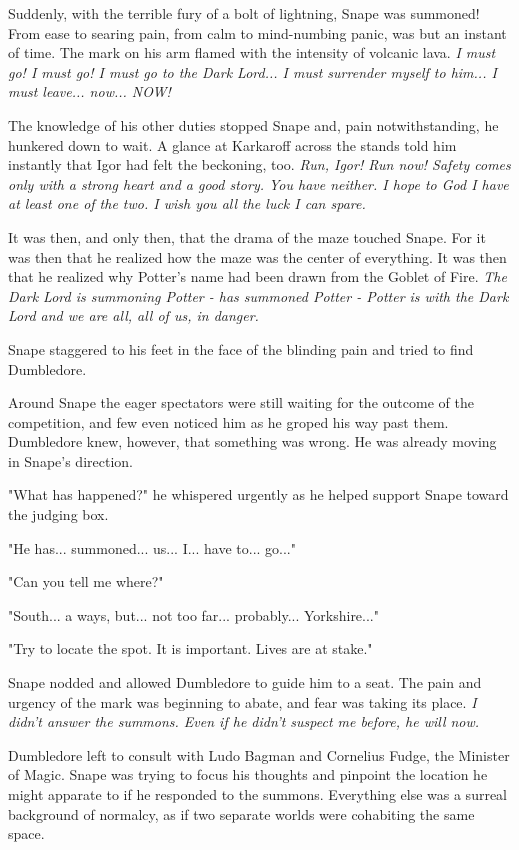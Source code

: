 Suddenly, with the terrible fury of a bolt of lightning, Snape was summoned! From ease to searing pain, from calm to mind-numbing panic, was but an instant of time. The mark on his arm flamed with the intensity of volcanic lava. \emph{I must go! I must go! I must go to the Dark Lord... I must surrender myself to him... I must leave... now... NOW!}

The knowledge of his other duties stopped Snape and, pain notwithstanding, he hunkered down to wait. A glance at Karkaroff across the stands told him instantly that Igor had felt the beckoning, too. \emph{Run, Igor! Run now! Safety comes only with a strong heart and a good story. You have neither. I hope to God I have at least one of the two. I wish you all the luck I can spare.}

It was then, and only then, that the drama of the maze touched Snape. For it was then that he realized how the maze was the center of everything. It was then that he realized why Potter's name had been drawn from the Goblet of Fire. \emph{The Dark Lord is summoning Potter - has summoned Potter - Potter is with the Dark Lord and we are all, all of us, in danger.}

Snape staggered to his feet in the face of the blinding pain and tried to find Dumbledore.

Around Snape the eager spectators were still waiting for the outcome of the competition, and few even noticed him as he groped his way past them. Dumbledore knew, however, that something was wrong. He was already moving in Snape's direction.

"What has happened?" he whispered urgently as he helped support Snape toward the judging box.

"He has... summoned... us... I... have to... go..."

"Can you tell me where?"

"South... a ways, but... not too far... probably... Yorkshire..."

"Try to locate the spot. It is important. Lives are at stake."

Snape nodded and allowed Dumbledore to guide him to a seat. The pain and urgency of the mark was beginning to abate, and fear was taking its place. \emph{I didn't answer the summons. Even if he didn't suspect me before, he will now.}

Dumbledore left to consult with Ludo Bagman and Cornelius Fudge, the Minister of Magic. Snape was trying to focus his thoughts and pinpoint the location he might apparate to if he responded to the summons. Everything else was a surreal background of normalcy, as if two separate worlds were cohabiting the same space.


